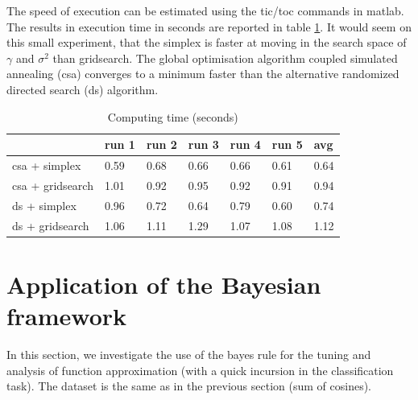\documentclass[11pt, a4paper]{article}
\begin{document}
The speed of execution can be estimated using the tic/toc commands in
matlab. The results in execution time in seconds are reported in table
\ref{tab:computing_param}. It would seem on this small experiment,
that the simplex is faster at moving in the search space of $\gamma$
and $\sigma^2$ than gridsearch. The global optimisation algorithm
coupled simulated annealing (csa) converges to a minimum faster than
the alternative randomized directed search (ds) algorithm.

\begin{table}[H]
  \centering
  \begin{tabular}{l|l|l|l|l|l|l|}
    \cline{2-7}
    & run 1 & run 2 & run 3 & run 4 & run 5 & avg  \\ \hline
    \multicolumn{1}{|l|}{csa + simplex}    & 0.59  & 0.68  & 0.66  & 0.66  & 0.61  & 0.64 \\ \hline
    \multicolumn{1}{|l|}{csa + gridsearch} & 1.01  & 0.92  & 0.95  & 0.92  & 0.91  & 0.94 \\ \hline
    \multicolumn{1}{|l|}{ds + simplex}     & 0.96  & 0.72  & 0.64  & 0.79  & 0.60  & 0.74 \\ \hline
    \multicolumn{1}{|l|}{ds + gridsearch}  & 1.06  & 1.11  & 1.29  & 1.07  & 1.08  & 1.12 \\ \hline
  \end{tabular}
  \caption{Computing time (seconds)}
  \label{tab:computing_param}
\end{table}


\section{Application of the Bayesian framework}

In this section, we investigate the use of the bayes rule for the
tuning and analysis of function approximation (with a quick incursion
in the classification task). The dataset is the same as in the
previous section (sum of cosines).
\end{document}
